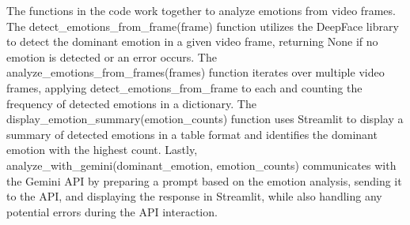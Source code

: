 \noindent
The functions in the code work together to analyze emotions from video frames. The detect\_emotions\_from\_frame(frame) function utilizes the DeepFace library to detect the dominant emotion in a given video frame, returning None if no emotion is detected or an error occurs. The analyze\_emotions\_from\_frames(frames) function iterates over multiple video frames, applying detect\_emotions\_from\_frame to each and counting the frequency of detected emotions in a dictionary. The display\_emotion\_summary(emotion\_counts) function uses Streamlit to display a summary of detected emotions in a table format and identifies the dominant emotion with the highest count. Lastly, analyze\_with\_gemini(dominant\_emotion, emotion\_counts) communicates with the Gemini API by preparing a prompt based on the emotion analysis, sending it to the API, and displaying the response in Streamlit, while also handling any potential errors during the API interaction.


